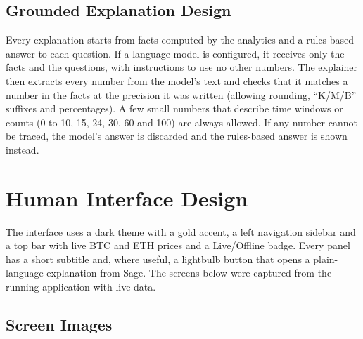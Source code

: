 \subsection{Grounded Explanation Design}
Every explanation starts from facts computed by the analytics and a rules-based answer to each question. If a language model is configured, it receives only the facts and the questions, with instructions to use no other numbers. The explainer then extracts every number from the model's text and checks that it matches a number in the facts at the precision it was written (allowing rounding, ``K/M/B'' suffixes and percentages). A few small numbers that describe time windows or counts (0 to 10, 15, 24, 30, 60 and 100) are always allowed. If any number cannot be traced, the model's answer is discarded and the rules-based answer is shown instead.

\section{Human Interface Design}
The interface uses a dark theme with a gold accent, a left navigation sidebar and a top bar with live BTC and ETH prices and a Live/Offline badge. Every panel has a short subtitle and, where useful, a lightbulb button that opens a plain-language explanation from Sage. The screens below were captured from the running application with live data.

\subsection{Screen Images}

